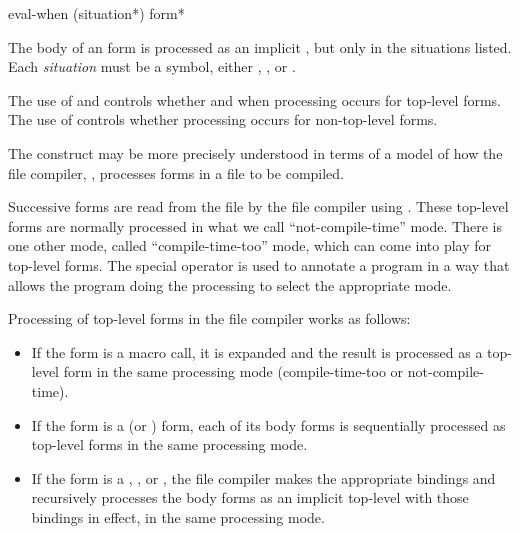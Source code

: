 \begin{defspec}
eval-when ({situation}*) {form}*

  The body of an  form is processed as an implicit , but
  only in the situations listed.  Each \emph{situation} must be a symbol,
  either ,
  , or .

  The use of  and 
  controls whether and when processing
  occurs for top-level forms. The use of  controls whether
  processing occurs for non-top-level forms.

  The  construct may be more precisely understood in terms of
  a model of how the file compiler, , processes forms in a
  file to be compiled.

  Successive forms are read from the file by the file compiler using 
  . These top-level forms are normally processed in what we call
  ``not-compile-time'' mode. There is one other mode, called 
  ``compile-time-too'' mode, which can come into play for top-level
  forms. The  special operator is used to annotate a program
  in a way that allows the program doing the processing to select
  the appropriate mode.

  Processing of top-level forms in the file compiler works as follows:

\begin{itemize}
   \item If the form is a macro call, it is expanded and the result is
     processed as a top-level form in the same processing mode
     (compile-time-too or not-compile-time).

   \item If the form is a  (or  )
     form, each of its body forms is
     sequentially processed as top-level forms in the same processing
     mode.

   \item If the form is a , ,
     or ,
     the file compiler makes the appropriate bindings and recursively
     processes the body forms as an implicit top-level  with those 
     bindings in effect, in the same processing mode.


\end{itemize}
\end{defspec}
